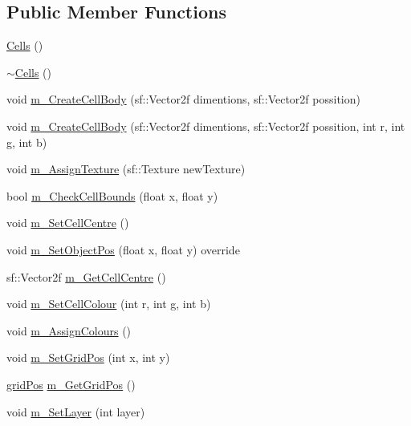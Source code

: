 \subsection*{Public Member Functions}
\begin{DoxyCompactItemize}
\item 
\mbox{\hyperlink{class_cells_a092d62bc15648a54755a413dbf9a2db0}{Cells}} ()
\item 
\mbox{\hyperlink{class_cells_aab121634db81b439226a33fd099fb3c1}{$\sim$\+Cells}} ()
\item 
void \mbox{\hyperlink{class_cells_a5f009c592371d6bad0e49b2ff2bfd811}{m\+\_\+\+Create\+Cell\+Body}} (sf\+::\+Vector2f dimentions, sf\+::\+Vector2f possition)
\item 
void \mbox{\hyperlink{class_cells_a6405637a987f8af6210518d21b284c5d}{m\+\_\+\+Create\+Cell\+Body}} (sf\+::\+Vector2f dimentions, sf\+::\+Vector2f possition, int r, int g, int b)
\item 
void \mbox{\hyperlink{class_cells_a943b866ae140765aaa6d8113ad68065c}{m\+\_\+\+Assign\+Texture}} (sf\+::\+Texture new\+Texture)
\item 
bool \mbox{\hyperlink{class_cells_a49ad6477b62bb29973f3e248909e216b}{m\+\_\+\+Check\+Cell\+Bounds}} (float x, float y)
\item 
void \mbox{\hyperlink{class_cells_abf00b8c57ba89e13c2ee86f22051e56f}{m\+\_\+\+Set\+Cell\+Centre}} ()
\item 
void \mbox{\hyperlink{class_cells_a5d900205d8d5fc3d3b41b664d51994c4}{m\+\_\+\+Set\+Object\+Pos}} (float x, float y) override
\item 
sf\+::\+Vector2f \mbox{\hyperlink{class_cells_ae61d97e90ef66528c67be257531c4359}{m\+\_\+\+Get\+Cell\+Centre}} ()
\item 
void \mbox{\hyperlink{class_cells_a54a485e9bed0760a0a7464311b59a700}{m\+\_\+\+Set\+Cell\+Colour}} (int r, int g, int b)
\item 
void \mbox{\hyperlink{class_cells_a4f59f13bfeec4f70dbd2133e86b747eb}{m\+\_\+\+Assign\+Colours}} ()
\item 
void \mbox{\hyperlink{class_cells_ace2656aa881803e17d7d53c9031e6ee4}{m\+\_\+\+Set\+Grid\+Pos}} (int x, int y)
\item 
\mbox{\hyperlink{structgrid_pos}{grid\+Pos}} \mbox{\hyperlink{class_cells_a81750cfd622629b65d615cec1d4edb48}{m\+\_\+\+Get\+Grid\+Pos}} ()
\item 
void \mbox{\hyperlink{class_cells_a4978491aa8ad58dd1c1f2ad0431d78b6}{m\+\_\+\+Set\+Layer}} (int layer)
\item 

\end{DoxyCompactItemize}
